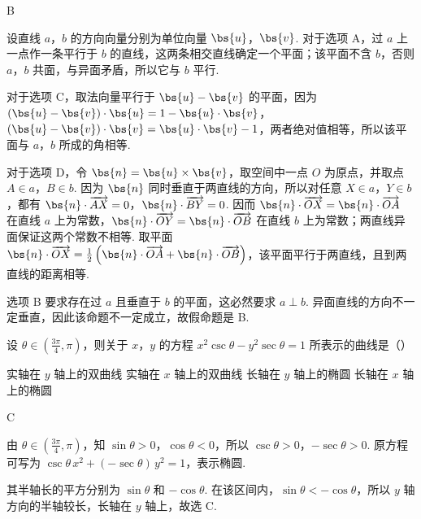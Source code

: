 \begin{answer}
B
\end{answer}

\begin{solution}
设直线 \(a\)，\(b\) 的方向向量分别为单位向量 \(\bs{u}\)，\(\bs{v}\). 对于选项 A，过 \(a\) 上一点作一条平行于 \(b\) 的直线，这两条相交直线确定一个平面；该平面不含 \(b\)，否则 \(a\)，\(b\) 共面，与异面矛盾，所以它与 \(b\) 平行.

对于选项 C，取法向量平行于 \(\bs{u}-\bs{v}\) 的平面，因为
\(\left(\bs{u}-\bs{v}\right)\cdot\bs{u}=1-\bs{u}\cdot\bs{v}\)，\(\left(\bs{u}-\bs{v}\right)\cdot\bs{v}=\bs{u}\cdot\bs{v}-1\)，两者绝对值相等，所以该平面与 \(a\)，\(b\) 所成的角相等.

对于选项 D，令 \(\bs{n}=\bs{u}\times\bs{v}\)，取空间中一点 \(O\) 为原点，并取点 \(A\in a\)，\(B\in b\). 因为 \(\bs{n}\) 同时垂直于两直线的方向，所以对任意 \(X\in a\)，\(Y\in b\)，都有 \(\bs{n}\cdot\overrightarrow{AX}=0\)，\(\bs{n}\cdot\overrightarrow{BY}=0\). 因而 \(\bs{n}\cdot\overrightarrow{OX}=\bs{n}\cdot\overrightarrow{OA}\) 在直线 \(a\) 上为常数，\(\bs{n}\cdot\overrightarrow{OY}=\bs{n}\cdot\overrightarrow{OB}\) 在直线 \(b\) 上为常数；两直线异面保证这两个常数不相等. 取平面
\(\bs{n}\cdot\overrightarrow{OX}=\frac{1}{2}\left(\bs{n}\cdot\overrightarrow{OA}+\bs{n}\cdot\overrightarrow{OB}\right)\)，该平面平行于两直线，且到两直线的距离相等.

选项 B 要求存在过 \(a\) 且垂直于 \(b\) 的平面，这必然要求 \(a\perp b\). 异面直线的方向不一定垂直，因此该命题不一定成立，故假命题是 B.
\end{solution}

\begin{problem}
设 \(\theta \in \left(\frac{3\pi}{4}, \pi\right)\)，则关于 \(x\)，\(y\) 的方程 \(x^2 \csc \theta - y^2 \sec \theta = 1\) 所表示的曲线是（\quad）

\choices
    {实轴在 \(y\) 轴上的双曲线}
    {实轴在 \(x\) 轴上的双曲线}
    {长轴在 \(y\) 轴上的椭圆}
    {长轴在 \(x\) 轴上的椭圆}
\end{problem}

\begin{answer}
C
\end{answer}

\begin{solution}
由 \(\theta\in\left(\frac{3\pi}{4},\pi\right)\)，知 \(\sin\theta>0\)，\(\cos\theta<0\)，所以 \(\csc\theta>0\)，\(-\sec\theta>0\). 原方程可写为
\(\csc\theta\,x^2+(-\sec\theta)\,y^2=1\)，表示椭圆.

其半轴长的平方分别为 \(\sin\theta\) 和 \(-\cos\theta\). 在该区间内，\(\sin\theta<-\cos\theta\)，所以 \(y\) 轴方向的半轴较长，长轴在 \(y\) 轴上，故选 C.
\end{solution}


